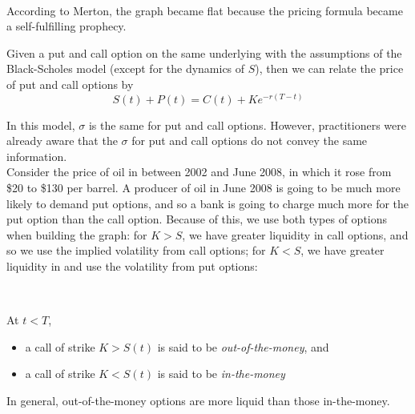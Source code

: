 \documentclass[11pt]{article}
\begin{document}
 \\

According to Merton, the graph became flat because the pricing formula became a self-fulfilling prophecy. \\

\begin{remark} Given a put and call option on the same underlying with the assumptions of the Black-Scholes model (except for the dynamics of $S$), then we can relate the price of put and call options by
$$S(t) + P(t) = C(t) + Ke^{-r(T-t)}$$
\end{remark}
In this model, $\sigma$ is the same for put and call options. However, practitioners were already aware that the $\sigma$ for put and call options do not convey the same information. \\

Consider the price of oil in between 2002 and June 2008, in which it rose from \$20 to \$130 per barrel.  A producer of oil in June 2008 is going to be much more likely to demand put options, and so a bank is going to charge much more for the put option than the call option. Because of this, we use both types of options when building the graph: for $K > S$, we have greater liquidity in call options, and so we use the implied volatility from call options; for $K < S$, we have greater liquidity in and use the volatility from put options: \\

 \\

\begin{definition}[moneyness]
At $t < T$,
\begin{itemize}
\item a call of strike $K > S(t)$ is said to be {\em out-of-the-money}, and
\item a call of strike $K < S(t)$ is said to be {\em in-the-money}
\end{itemize}
\end{definition}
In general, out-of-the-money options are more liquid than those in-the-money.
\end{document}
